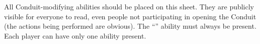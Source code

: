 \documentclass[green]{elementals}
\begin{document}
\name{\gConduitModifier{}}

All Conduit-modifying abilities should be placed on this sheet. They are publicly visible for everyone to read, even people not participating in opening the Conduit (the actions being performed are obvious). The ``\aWorkConduit{}'' ability must always be present. Each player can have only one ability present.
\end{document}
